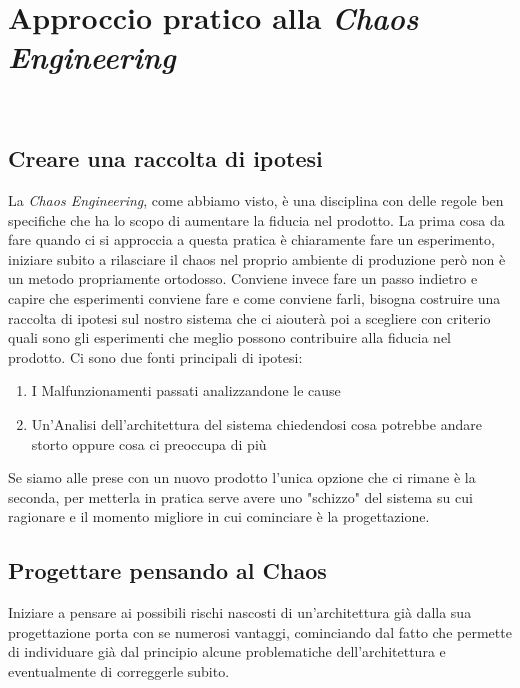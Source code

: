 
\chapter{Approccio pratico alla \textit{Chaos Engineering}}
\label{cap:descrizione-stage}

\\

\section{Creare una raccolta di ipotesi}
La \textit{Chaos Engineering}, come abbiamo visto, è una disciplina con delle regole ben specifiche che ha lo scopo di aumentare la fiducia nel prodotto.
La prima cosa da fare quando ci si approccia a questa pratica è chiaramente fare un esperimento, iniziare subito a rilasciare il chaos nel proprio ambiente di produzione però non è un metodo propriamente ortodosso.
Conviene invece fare un passo indietro e capire che esperimenti conviene fare e come conviene farli, bisogna costruire una raccolta di ipotesi sul nostro sistema che ci aiouterà poi a scegliere con criterio quali sono gli esperimenti che meglio possono contribuire alla fiducia nel prodotto.
Ci sono due fonti principali di ipotesi:
\begin{enumerate}
    \item I Malfunzionamenti passati analizzandone le cause
    \item Un'Analisi dell'architettura del sistema chiedendosi cosa potrebbe andare storto oppure cosa ci preoccupa di più
\end{enumerate}
Se siamo alle prese con un nuovo prodotto l'unica opzione che ci rimane è la seconda, per metterla in pratica serve avere uno "schizzo" del sistema su cui ragionare e il momento migliore in cui cominciare è la progettazione.

\section{Progettare pensando al Chaos}
Iniziare a pensare ai possibili rischi nascosti di un'architettura già dalla sua progettazione porta con se numerosi vantaggi, cominciando dal fatto che permette di individuare già dal principio alcune problematiche dell'architettura e eventualmente di correggerle subito.

